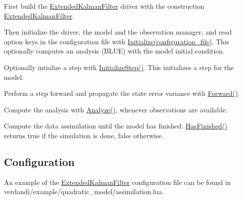 \documentclass{tufte-book}
\begin{document}
\begin{DoxyEnumerate}
\item \-First build the {\ttfamily  \hyperlink{class_verdandi_1_1_extended_kalman_filter}{\-Extended\-Kalman\-Filter}} driver with the construction {\ttfamily  \hyperlink{class_verdandi_1_1_extended_kalman_filter_aec315cc36c89d5f01114636c8fc8d701}{\-Extended\-Kalman\-Filter}}.


\item \-Then initialize the driver, the model and the observation manager, and read option keys in the configuration file with {\ttfamily  \hyperlink{class_verdandi_1_1_extended_kalman_filter_a74653334f0753417237742f88bdc6a08}{\-Initialize(configuration\-\_\-file)}}. \-This optionally computes an analysis (\-B\-L\-U\-E) with the model initial condition.


\item \-Optionally intialize a step with {\ttfamily  \hyperlink{class_verdandi_1_1_extended_kalman_filter_a2a95feb5808c086a01dbb34ecb171e70}{\-Initialize\-Step()}}. \-This initializes a step for the model.


\item \-Perform a step forward and propagate the state error variance with {\ttfamily  \hyperlink{class_verdandi_1_1_extended_kalman_filter_a00e1741e3ddb28ba7d8e8f2e4f2068e6}{\-Forward()}}.


\item \-Compute the analysis with {\ttfamily  \hyperlink{class_verdandi_1_1_extended_kalman_filter_a49ea2f90bf6ecb16e37e5c0a3c275f40}{\-Analyze()}}, whenever observations are available.


\item \-Compute the data assimilation until the model has finished\-: {\ttfamily  \hyperlink{class_verdandi_1_1_extended_kalman_filter_a13923684be25c10b04b164fc8d185df1}{\-Has\-Finished()}} returns true if the simulation is done, false otherwise.
\end{DoxyEnumerate}




\hypertarget{ekf_configuration}{}\subsection{\-Configuration}\label{ekf_configuration}

 An example of the {\ttfamily  \hyperlink{class_verdandi_1_1_extended_kalman_filter}{\-Extended\-Kalman\-Filter}} configuration file can be found in  {\ttfamily verdandi/example/quadratic\_model/assimilation.lua}.
\end{document}
